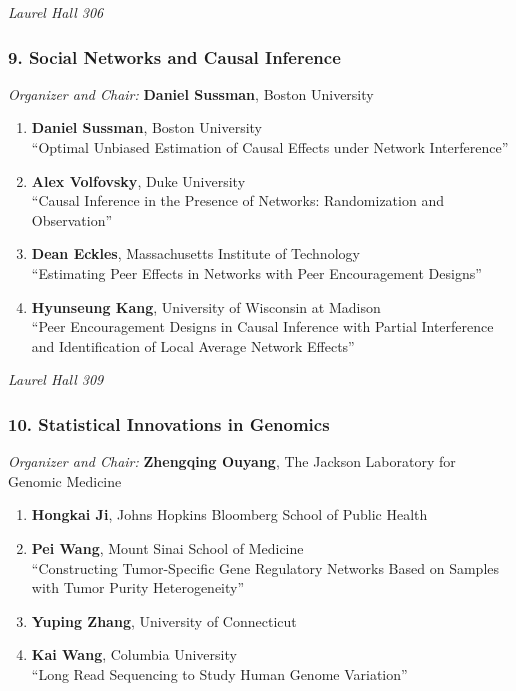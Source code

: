 \emph{Laurel Hall 306} \\[.5em]

\subsubsection*{9. Social Networks and Causal Inference}

\emph{Organizer and Chair:} \textbf{Daniel Sussman}, Boston University

\begin{enumerate}
\item \textbf{Daniel Sussman}, Boston University \\
``Optimal Unbiased Estimation of Causal Effects under Network Interference''
\item \textbf{Alex Volfovsky}, Duke University \\
``Causal Inference in the Presence of Networks: Randomization and Observation''
\item \textbf{Dean Eckles}, Massachusetts Institute of Technology \\
``Estimating Peer Effects in Networks with Peer Encouragement Designs''
\item \textbf{Hyunseung Kang}, University of Wisconsin at Madison \\
``Peer Encouragement Designs in Causal Inference with Partial Interference and Identification of Local Average Network Effects''
\end{enumerate}

\emph{Laurel Hall 309} \\[.5em]

\subsubsection*{10. Statistical Innovations in Genomics}

\emph{Organizer and Chair:} \textbf{Zhengqing Ouyang}, The Jackson Laboratory for Genomic Medicine

\begin{enumerate}
\item \textbf{Hongkai Ji}, Johns Hopkins Bloomberg School of Public Health 
\item \textbf{Pei Wang}, Mount Sinai School of Medicine \\
``Constructing Tumor-Specific Gene Regulatory Networks Based on Samples with Tumor Purity Heterogeneity''
\item \textbf{Yuping Zhang}, University of Connecticut 
\item \textbf{Kai Wang}, Columbia University \\
``Long Read Sequencing to Study Human Genome Variation''
\end{enumerate}

